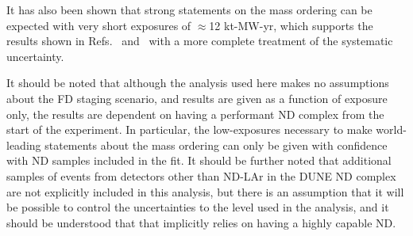 It has also been shown that strong statements on the mass ordering can be expected with very short exposures of $\approx$12 kt-MW-yr, which supports the results shown in Refs.~\cite{Abi:2020qib} and~\cite{Abi:2020evt} with a more complete treatment of the systematic uncertainty.

It should be noted that although the analysis used here makes no assumptions about the FD staging scenario, and results are given as a function of exposure only, the results are dependent on having a performant ND complex from the start of the experiment. In particular, the low-exposures necessary to make world-leading statements about the mass ordering can only be given with confidence with ND samples included in the fit. It should be further noted that additional samples of events from detectors other than ND-LAr in the DUNE ND complex are not explicitly included in this analysis, but there is an assumption that it will be possible to control the uncertainties to the level used in the analysis, and it should be understood that that implicitly relies on having a highly capable ND.
